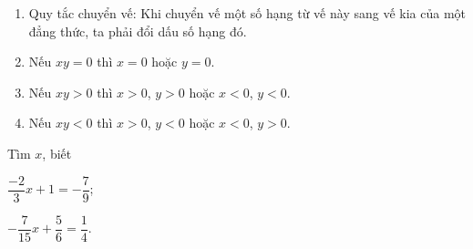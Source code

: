 \begin{dang}
	\begin{enumerate}[\tickEX]
		\item Quy tắc chuyển vế: Khi chuyển vế một số hạng từ vế này sang vế kia của một đẳng thức, ta phải đổi dấu số hạng đó.
		\item Nếu $x y =0$ thì $x=0$ hoặc $y=0$.
		\item Nếu $xy >0$ thì $x>0$, $y>0$ hoặc $x<0$, $y<0$.
		\item Nếu $xy <0$ thì $x>0$, $y<0$ hoặc $x<0$, $y>0$.
	\end{enumerate}
\end{dang}

\begin{vd}
Tìm $x$, biết
	\begin{listEX}[2]
		\item $\dfrac{-2}{3} x + 1 = - \dfrac{7}{9}$;
		\item $- \dfrac{7}{15} x + \dfrac{5}{6} = \dfrac{1}{4}$.
	\end{listEX}
\end{vd}


